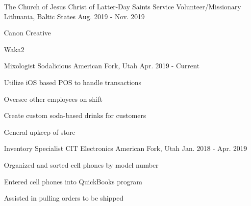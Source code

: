 

\begin{cventries}

  \cventry
    {The Church of Jesus Christ of Latter-Day Saints} %
    {Service Volunteer/Missionary} %
    {Lithuania, Baltic States} %
    {Aug. 2019 - Nov. 2019} %
    {
      \begin{cvitems} %
        \item {Canon Creative}
        \item {Waka2}
      \end{cvitems}
    }

  \cventry
    {Mixologist} %
    {Sodalicious} %
    {American Fork, Utah} %
    {Apr. 2019 - Current} %
    {
      \begin{cvitems} %
        \item {Utilize iOS based POS to handle transactions}
        \item {Oversee other employees on shift}
        \item {Create custom soda-based drinks for customers}
        \item {General upkeep of store}
      \end{cvitems}
    }

  \cventry
    {Inventory Specialist} %
    {CIT Electronics} %
    {American Fork, Utah} %
    {Jan. 2018 - Apr. 2019} %
    {
      \begin{cvitems} %
        \item {Organized and sorted cell phones by model number}
        \item {Entered cell phones into QuickBooks program}
        \item {Assisted in pulling orders to be shipped}
      \end{cvitems}
    }


\end{cventries}
